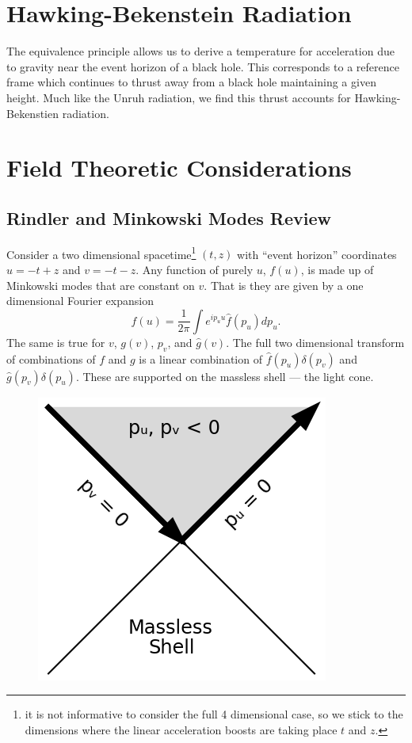 \documentclass[12pt,a4paper]{article}
\begin{document}
\section{Hawking-Bekenstein Radiation}

The equivalence principle allows us to derive a temperature for acceleration due to gravity near the event horizon of a black hole.  This corresponds to a reference frame which continues to thrust away from a black hole maintaining a given height.  Much like the Unruh radiation, we find this thrust accounts for Hawking-Bekenstien radiation.

\section{Field Theoretic Considerations}
\subsection{Rindler and Minkowski Modes Review}
Consider a two dimensional spacetime\footnote{it is not informative to consider the full 4 dimensional case, so we stick to the dimensions where the linear acceleration boosts are taking place $t$ and $z$.} $(t,z)$ with ``event horizon'' coordinates $u = -t + z$ and $v = -t - z$.   Any function of purely $u$, $f(u)$, is made up of Minkowski modes that are constant on $v$.  That is they are given by a one dimensional Fourier expansion
\[
f(u) = \frac{1}{2\pi} \int{e^{i p_u u} \hat{f}(p_u) dp_u}.
\]
The same is true for $v$, $g(v)$, $p_v$, and $\hat{g}(v)$.  The full two dimensional transform of combinations of $f$ and $g$ is a linear combination of $\hat{f}(p_u) \delta(p_v)$ and $\hat{g}(p_v) \delta(p_u)$.  These are supported on the massless shell --- the light cone.

\begin{figure}[h]
\centering
\includegraphics[scale=1.0]{massless_shell.png}
\caption{}
\label{masslessshell}
\end{figure}
\end{document}
